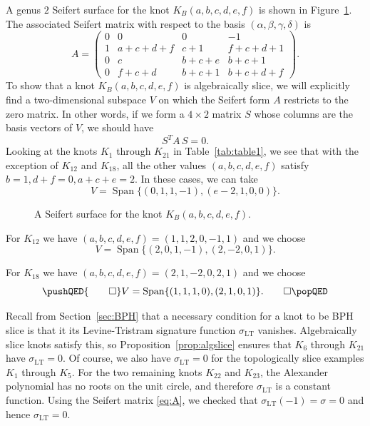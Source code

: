\documentclass [11pt]{amsart}
\theoremstyle{remark}
\def\sigmaTL{\sigma_{\operatorname{LT}}}
\def\Span{\operatorname{Span}}
\begin{document}
A genus $2$ Seifert surface for the knot $K_B(a,b,c,d,e,f)$ is shown in Figure~\ref{fig:SeifertSurface}. The associated Seifert matrix with respect to the basis $(\alpha, \beta, \gamma, \delta)$ is
\begin{equation}
\label{eq:A}
A = \begin{pmatrix} 0 & 0 & 0 & -1 \\ 1 & a+c+d+f & c+1 & f+c+d+1 \\
0 & c & b+c+e & b+c+1 \\ 0 & f+c+d & b+c+1 & b+c+d+f
\end{pmatrix}.
\end{equation}
To show that a knot $K_B(a,b,c,d,e,f)$ is algebraically slice, we will explicitly find a two-dimensional subspace $V$ on which the Seifert form $A$ restricts to the zero matrix. In other words, if we form a $4 \times 2$ matrix $S$ whose columns are the basis vectors of $V$, we should have
$$ S^T \! A \, S = 0.$$
Looking at the knots $K_1$ through $K_{21}$ in Table~\ref{tab:table1}, we see that with the exception of $K_{12}$ and $K_{18}$, all the other values $(a, b, c, d, e, f)$ satisfy $b=1, d+f=0, a+c+e=2$. In these cases, we can take
$$ V=\Span\{ (0,1,1,-1), (e-2,1,0,0)\}.$$
\begin{figure}
{
   \fontsize{9pt}{11pt}\selectfont
   \def\svgwidth{3.5in}
   
}
\caption{A Seifert surface for the knot $K_B(a,b,c,d,e,f)$.}
\label{fig:SeifertSurface}
\end{figure}

For $K_{12}$ we have $(a, b, c, d, e, f)=(1,1,2,0,-1,1)$ and we choose
$$ V=\Span\{ (2,0,1,-1), (2,-2,0,1)\}.$$

For $K_{18}$ we have $(a, b, c, d, e, f)=(2,1,-2,0,2,1)$ and we choose
\[
\pushQED{\qed} 
 V=\Span\{ (1,1,1,0), (2,1,0,1)\}.\qedhere
\popQED
\] 

Recall from Section~\ref{sec:BPH} that a necessary condition for a knot to be BPH slice is that it its Levine-Tristram signature function $\sigmaTL$ vanishes. Algebraically slice knots satisfy this, so Proposition~\ref{prop:algslice} ensures that $K_6$ through $K_{21}$ have $\sigmaTL=0$. Of course, we also have $\sigmaTL=0$ for the topologically slice examples $K_1$ through $K_5$. For the two remaining knots $K_{22}$ and $K_{23}$, the Alexander polynomial has no roots on the unit circle, and therefore $\sigmaTL$ is a constant function. Using the Seifert matrix \eqref{eq:A}, we checked that $\sigmaTL(-1) = \sigma=0$ and hence $\sigmaTL=0$. 
\end{document}
